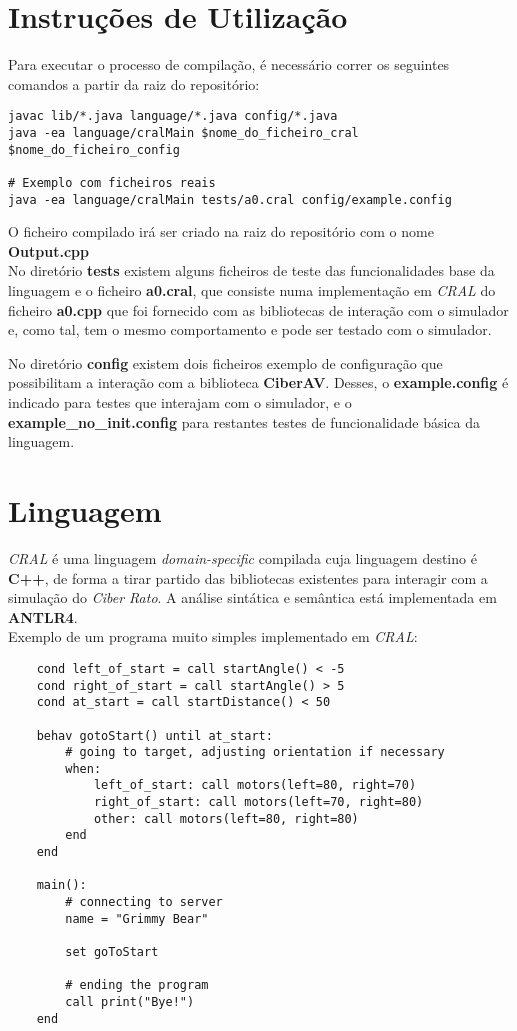 \documentclass{report}
\begin{document}
\chapter{Instruções de Utilização}
\label{chap.instructions}

Para executar o processo de compilação, é necessário correr os seguintes comandos a partir da raiz do repositório:
\begin{verbatim}
javac lib/*.java language/*.java config/*.java
java -ea language/cralMain $nome_do_ficheiro_cral $nome_do_ficheiro_config

# Exemplo com ficheiros reais
java -ea language/cralMain tests/a0.cral config/example.config
\end{verbatim}

O ficheiro compilado irá ser criado na raiz do repositório com o nome \textbf{Output.cpp}\\

No diretório \textbf{tests} existem alguns ficheiros de teste das funcionalidades base da linguagem e o ficheiro \textbf{a0.cral}, que consiste numa implementação em \textit{CRAL} do ficheiro \textbf{a0.cpp} que foi fornecido com as bibliotecas de interação com o simulador e, como tal, tem o mesmo comportamento e pode ser testado com o simulador.

No diretório \textbf{config} existem dois ficheiros exemplo de configuração que possibilitam a interação com a biblioteca \textbf{CiberAV}. Desses, o \textbf{example.config} é indicado para testes que interajam com o simulador, e o \textbf{example\_no\_init.config} para restantes testes de funcionalidade básica da linguagem.

\chapter{Linguagem}
\label{chap.language}
\textit{CRAL} é uma linguagem \textit{domain-specific} compilada cuja linguagem destino é \textbf{C++}, de forma a tirar partido das bibliotecas existentes para interagir com a simulação do \textit{Ciber Rato}.
A análise sintática e semântica está implementada em \textbf{ANTLR4}.\\

Exemplo de um programa muito simples implementado em \textit{CRAL}:
\begin{verbatim}
    cond left_of_start = call startAngle() < -5
    cond right_of_start = call startAngle() > 5
    cond at_start = call startDistance() < 50

    behav gotoStart() until at_start:
        # going to target, adjusting orientation if necessary
        when:
            left_of_start: call motors(left=80, right=70)
            right_of_start: call motors(left=70, right=80)
            other: call motors(left=80, right=80)
        end
    end
    
    main():
        # connecting to server
        name = "Grimmy Bear"
        
        set goToStart
        
        # ending the program
        call print("Bye!")
    end
\end{verbatim}
\end{document}
